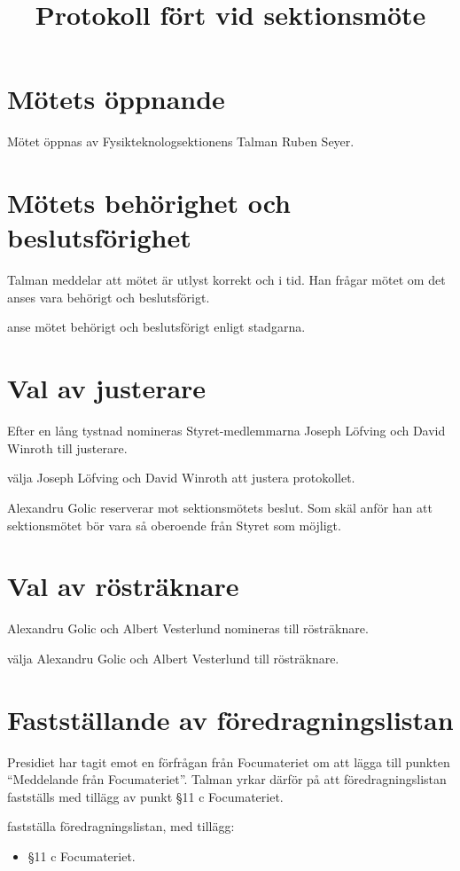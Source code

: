 \documentclass[hidelinks]{../sektionsmote} %
\title{Protokoll fört vid sektionsmöte}
\begin{document}
\maketitle

\section{Mötets öppnande}
Mötet öppnas \tid av Fysikteknologsektionens Talman Ruben Seyer.


\section{Mötets behörighet och beslutsförighet}
Talman meddelar att mötet är utlyst korrekt och i tid.
Han frågar mötet om det anses vara behörigt och beslutsförigt.
\begin{beslut}
    \item anse mötet behörigt och beslutsförigt enligt stadgarna.
\end{beslut}


\section{Val av justerare}
Efter en lång tystnad nomineras Styret-medlemmarna Joseph Löfving och David Winroth till justerare.
\begin{beslut}
    \item välja Joseph Löfving och David Winroth att justera protokollet. 
\end{beslut}
Alexandru Golic reserverar mot sektionsmötets beslut.
Som skäl anför han att sektionsmötet bör vara så oberoende från Styret som möjligt.


\section{Val av rösträknare}
Alexandru Golic och Albert Vesterlund nomineras till rösträknare.
\begin{beslut}
    \item välja Alexandru Golic och Albert Vesterlund till rösträknare.
\end{beslut}


\section{Fastställande av föredragningslistan}
Presidiet har tagit emot en förfrågan från Focumateriet om att lägga till punkten \enquote{Meddelande från Focumateriet}.
Talman yrkar därför på att föredragningslistan fastställs med tillägg av punkt §11 c Focumateriet.
\begin{beslut}
    \item fastställa föredragningslistan, med tillägg: 
    \begin{itemize}
        \item §11 c Focumateriet.
    \end{itemize}
\end{beslut}
\end{document}
